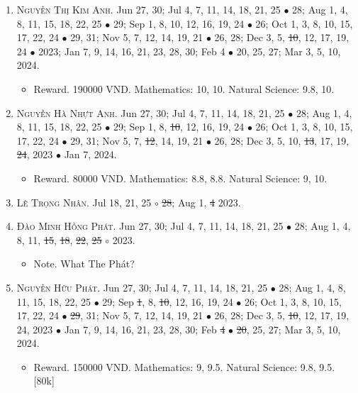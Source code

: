 \documentclass{article}
\begin{document}
\begin{enumerate}
	\item \textsc{Nguyễn Thị Kim Anh.} {\sf[In]} Jun 27, 30; Jul 4, 7, 11, 14, 18, 21, 25 $\bullet$ 28; Aug 1, 4, 8, 11, 15, 18, 22, 25 $\bullet$ 29; Sep 1, 8, 10, 12, 16, 19, 24 $\bullet$ 26; Oct 1, 3, 8, 10, 15, 17, 22, 24 $\bullet$ 29, 31; Nov 5, 7, 12, 14, 19, 21 $\bullet$ 26, 28; Dec 3, 5, \st{10}, 12, 17, 19, 24 $\bullet$ 2023; Jan 7, 9, 14, 16, 21, 23, 28, 30; Feb 4 $\bullet$ 20, 25, 27; Mar 3, 5, 10, 2024.
	\begin{itemize}
		\item {\sf Reward.} 190000 VND. Mathematics: 10, 10. Natural Science: 9.8, 10.
	\end{itemize}
	\item \textsc{Nguyễn Hà Nhựt Anh.} {\sf[In]} Jun 27, 30; Jul 4, 7, 11, 14, 18, 21, 25 $\bullet$ 28; Aug 1, 4, 8, 11, 15, 18, 22, 25 $\bullet$ 29; Sep 1, 8, \st{10}, 12, 16, 19, 24 $\bullet$ 26; Oct 1, 3, 8, 10, 15, 17, 22, 24 $\bullet$ 29, 31; Nov 5, 7, \st{12}, 14, 19, 21 $\bullet$ 26, 28; Dec 3, 5, 10, \st{13}, 17, 19, \st{24}, 2023 $\bullet$ Jan 7, 2024. {\sf[Out]}
	\begin{itemize}
		\item {\sf Reward.} 80000 VND. Mathematics: 8.8, 8.8. Natural Science: 9, 10.
	\end{itemize}
	\item \textsc{Lê Trọng Nhân.} {\sf[In]} Jul 18, 21, 25 $\circ$ \st{28}; Aug 1, \st{4} 2023. \sf{[Out]}
	\item \textsc{Đào Minh Hồng Phát.} {\sf[In]} Jun 27, 30; Jul 4, 7, 11, 14, 18, 21, 25 $\bullet$ 28; Aug 1, 4, 8, 11, \st{15}, \st{18}, \st{22}, \st{25} $\circ$ 2023. \sf{[Out]}
	\begin{itemize}
		\item {\sf Note.} What The Phát?
	\end{itemize}
	\item \textsc{Nguyễn Hữu Phát.} {\sf[In]} Jun 27, 30; Jul 4, 7, 11, 14, 18, 21, 25 $\bullet$ 28; Aug 1, 4, 8, 11, 15, 18, 22, 25 $\bullet$ 29; Sep \st{1}, 8, \st{10}, 12, 16, 19, 24 $\bullet$ 26; Oct 1, 3, 8, 10, 15, 17, 22, 24 $\bullet$ \st{29}, 31; Nov 5, 7, 12, 14, 19, 21 $\bullet$ 26, 28; Dec 3, 5, \st{10}, 12, 17, 19, 24, 2023 $\bullet$ Jan 7, 9, 14, 16, 21, 23, 28, 30; Feb \st{4} $\bullet$ \st{20}, 25, 27; Mar 3, 5, 10, 2024.
	\begin{itemize}
		\item {\sf Reward.} 150000 VND. Mathematics: 9, 9.5. Natural Science: 9.8, 9.5. [80k]

\end{itemize}
\end{enumerate}
\end{document}
